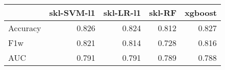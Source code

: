 \begin{tabular}{lrrrr}
\toprule
{} &  skl-SVM-l1 &  skl-LR-l1 &  skl-RF &  xgboost \\
\midrule
Accuracy &       0.826 &      0.824 &   0.812 &    0.827 \\
F1w      &       0.821 &      0.814 &   0.728 &    0.816 \\
AUC      &       0.791 &      0.791 &   0.789 &    0.788 \\
\bottomrule
\end{tabular}
